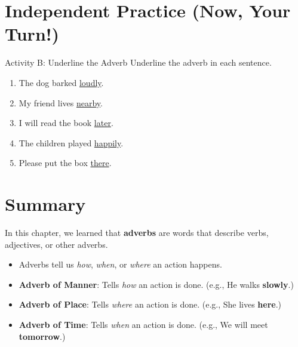 \section{Independent Practice (Now, Your Turn!)}
\begin{activitybox}{Activity B: Underline the Adverb}
Underline the adverb in each sentence.
\begin{enumerate}
    \item The dog barked \underline{loudly}.
    \item My friend lives \underline{nearby}.
    \item I will read the book \underline{later}.
    \item The children played \underline{happily}.
    \item Please put the box \underline{there}.
\end{enumerate}
\end{activitybox}

\section{Summary}
\begin{summarybox}
In this chapter, we learned that \textbf{adverbs} are words that describe verbs, adjectives, or other adverbs.
\begin{itemize}
    \item Adverbs tell us \textit{how}, \textit{when}, or \textit{where} an action happens.
    \item \textbf{Adverb of Manner}: Tells \textit{how} an action is done. (e.g., He walks \textbf{slowly}.)
    \item \textbf{Adverb of Place}: Tells \textit{where} an action is done. (e.g., She lives \textbf{here}.)
    \item \textbf{Adverb of Time}: Tells \textit{when} an action is done. (e.g., We will meet \textbf{tomorrow}.)
\end{itemize}
\end{summarybox}